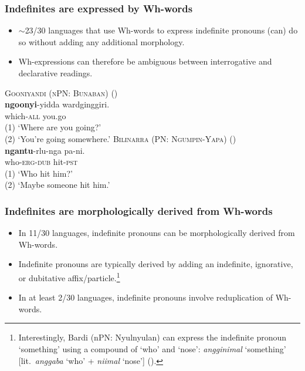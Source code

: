 \documentclass{article}
\begin{document}
\subsubsection{Indefinites are expressed by  Wh-words}
\begin{itemize}
\item $\sim$23/30 languages that use Wh-words to express indefinite pronouns (can) do so without adding any additional morphology.
\item Wh-expressions can therefore be ambiguous between interrogative and declarative readings.
\end{itemize}

\begin{exe}
\ex \textsc{Gooniyandi (nPN: Bunaban)} (\citealt[147]{mcgregor90})\\
\gll \textbf{ngoonyi}-yidda wardginggiri.\\
which-\textsc{all} you.go\\
\glt (1)  `Where are you going?' \\
(2) `You're going somewhere.'
\ex \textsc{Bilinarra (PN: Ngumpin-Yapa)} (\citealt[37]{nordlinger90})\\
\gll \textbf{ngantu}-rlu-nga pa-ni.\\
who-\textsc{erg-dub} hit-\textsc{pst}\\
\glt (1) `Who hit him?'\\
(2) `Maybe someone hit him.'
\end{exe}

\subsubsection{Indefinites are morphologically derived from Wh-words}
\begin{itemize}
\item In 11/30 languages, indefinite pronouns can be morphologically derived from Wh-words.
    \item Indefinite pronouns are typically derived by adding an indefinite, ignorative, or dubitative affix/particle.\footnote{Interestingly, Bardi (nPN: Nyulnyulan) can express the indefinite pronoun `something' using a compound of `who' and `nose': \textit{angginimal} `something' [lit.\ \textit{anggaba} `who' + \textit{niimal} `nose'] (\citealt[321]{bowern12}). }
    \item In at least 2/30 languages, indefinite pronouns involve reduplication of Wh-words.
\end{itemize}
\end{document}
